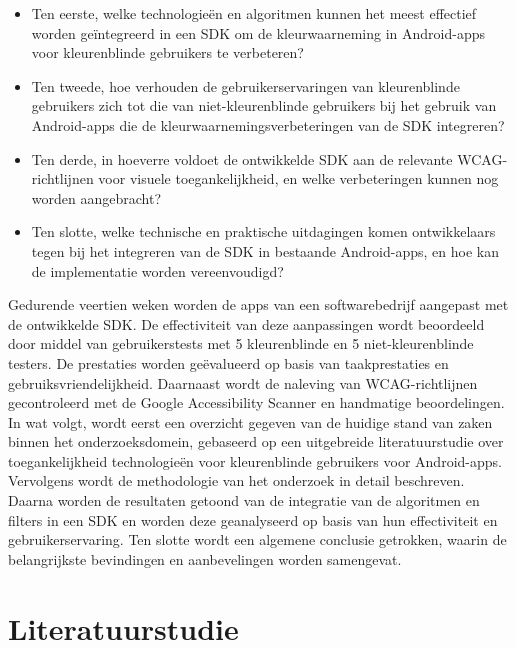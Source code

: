 \begin{itemize}
  \item Ten eerste, welke technologieën en algoritmen kunnen het meest effectief worden 
  geïntegreerd in een SDK om de kleurwaarneming in Android-apps voor kleurenblinde gebruikers 
  te verbeteren?
  \item Ten tweede, hoe verhouden de gebruikerservaringen van kleurenblinde gebruikers zich tot 
  die van niet-kleurenblinde gebruikers bij het gebruik van Android-apps die de 
  kleurwaarnemingsverbeteringen van de SDK integreren?
  \item Ten derde, in hoeverre voldoet de ontwikkelde SDK aan de relevante 
  WCAG-richtlijnen voor visuele toegankelijkheid, en welke verbeteringen kunnen nog worden 
  aangebracht?
  \item Ten slotte, welke technische en praktische uitdagingen komen ontwikkelaars tegen bij het 
  integreren van de SDK in bestaande Android-apps, en hoe kan de implementatie worden vereenvoudigd?
\end{itemize}
\bigskip
Gedurende veertien weken worden de apps van een softwarebedrijf aangepast met de ontwikkelde SDK. 
De effectiviteit van deze aanpassingen wordt beoordeeld door middel van gebruikerstests met 5 
kleurenblinde en 5 niet-kleurenblinde testers. De prestaties worden geëvalueerd op basis van 
taakprestaties en gebruiksvriendelijkheid. Daarnaast wordt de naleving van WCAG-richtlijnen 
gecontroleerd met de Google Accessibility Scanner en handmatige beoordelingen. In wat volgt, 
wordt eerst een overzicht gegeven van de huidige stand van zaken binnen het onderzoeksdomein, 
gebaseerd op een uitgebreide literatuurstudie over toegankelijkheid technologieën voor kleurenblinde 
gebruikers voor Android-apps. Vervolgens wordt de methodologie van het onderzoek in detail 
beschreven. Daarna worden de resultaten getoond van de integratie van de algoritmen en filters in 
een SDK en worden deze geanalyseerd op basis van hun effectiviteit en gebruikerservaring. Ten slotte 
wordt een algemene conclusie getrokken, waarin de belangrijkste bevindingen en aanbevelingen worden 
samengevat.
\section{Literatuurstudie}%
\label{sec:literatuurstudie}

